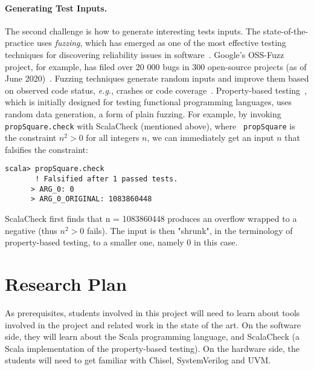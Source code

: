 \documentclass[fleqn,12pt]{article}
\begin{document}
\paragraph{Generating Test Inputs.}
The second challenge is how to generate interesting tests inputs.  The
state-of-the-practice uses \emph{fuzzing}, which has emerged as one of
the most effective testing techniques for discovering reliability
issues in software~\cite{takanen2018fuzzing}.  Google's OSS-Fuzz
project, for example, has filed over 20 000 bugs in 300 open-source
projects (as of June 2020)~\cite{web:oss-fuzz}.  Fuzzing techniques
generate random inputs and improve them based on observed code status,
\emph{e.g.}, crashes or code
coverage~\cite{DBLP:journals/tse/BohmePR19,DBLP:conf/pldi/FuS17}.
Property-based testing~\cite{DBLP:conf/icfp/ClaessenH00}, which is
initially designed for testing functional programming languages, uses
random data generation, a form of plain fuzzing. For example, by
invoking {\tt propSquare.check} with ScalaCheck (mentioned above), where {\tt
  propSquare} is the constraint $n^2>0$ for all integers $n$, we can
immediately get an input $n$ that falsifies the constraint:

\begin{lstlisting}[numbers=none]
scala> propSquare.check
       ! Falsified after 1 passed tests.
      > ARG_0: 0
      > ARG_0_ORIGINAL: 1083860448
\end{lstlisting}
 ScalaCheck first finds that n = 1083860448 produces an overflow
 wrapped to a negative (thus $n^2>0$ fails). The input is then
 "shrunk", in the terminology of property-based testing, to a smaller
 one, namely 0 in this case.







\section{Research Plan}







As prerequisites, students involved in this project will need to learn
about tools involved in the project and related work in the state of
the art. On the software side, they will learn about the 
Scala programming language, and ScalaCheck (a Scala implementation of
the property-based testing). On the hardware side,
the students will need to get familiar with Chisel, SystemVerilog and
UVM.
\end{document}
